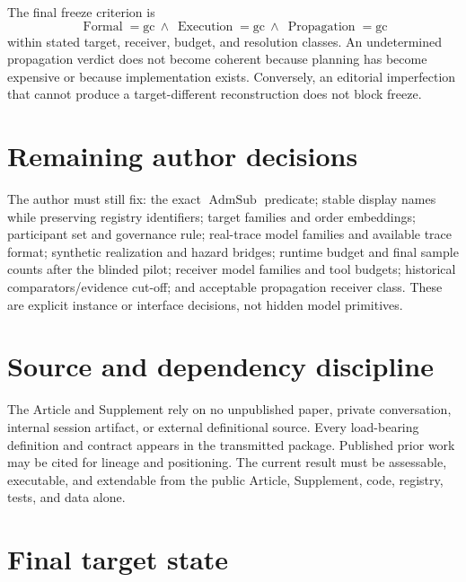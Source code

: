 \documentclass[11pt]{article}
\newcommand{\AdmSub}{\operatorname{AdmSub}}
\newcommand{\gc}{\mathrm{gc}}
\begin{document}
The final freeze criterion is
\begin{equation}
\boxed{\operatorname{Formal}=\gc\ \land\ \operatorname{Execution}=\gc\ \land\ \operatorname{Propagation}=\gc}
\end{equation}
within stated target, receiver, budget, and resolution classes. An undetermined propagation verdict does not become coherent because planning has become expensive or because implementation exists. Conversely, an editorial imperfection that cannot produce a target-different reconstruction does not block freeze.

\section{Remaining author decisions}

The author must still fix: the exact $\AdmSub$ predicate; stable display names while preserving registry identifiers; target families and order embeddings; participant set and governance rule; real-trace model families and available trace format; synthetic realization and hazard bridges; runtime budget and final sample counts after the blinded pilot; receiver model families and tool budgets; historical comparators/evidence cut-off; and acceptable propagation receiver class. These are explicit instance or interface decisions, not hidden model primitives.

\section{Source and dependency discipline}

The Article and Supplement rely on no unpublished paper, private conversation, internal session artifact, or external definitional source. Every load-bearing definition and contract appears in the transmitted package. Published prior work may be cited for lineage and positioning. The current result must be assessable, executable, and extendable from the public Article, Supplement, code, registry, tests, and data alone.

\section{Final target state}
\end{document}

